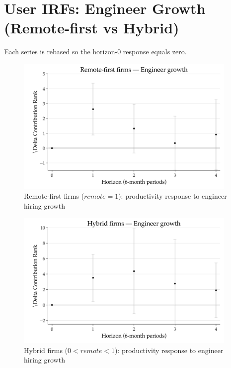 \documentclass[11pt]{article}
\begin{document}
\section*{User IRFs: Engineer Growth (Remote-first vs Hybrid)}

Each series is rebased so the horizon-0 response equals zero.

\begin{figure}[htbp]
    \centering
    \includegraphics[width=0.95\textwidth]{../../results/user_irfs_eng_vs_noneng_remote_hybrid/irf_remote_eng.png}
    \caption{Remote-first firms ($remote = 1$): productivity response to engineer hiring growth}
\end{figure}

\begin{figure}[htbp]
    \centering
    \includegraphics[width=0.95\textwidth]{../../results/user_irfs_eng_vs_noneng_remote_hybrid/irf_hybrid_eng.png}
    \caption{Hybrid firms ($0 < remote < 1$): productivity response to engineer hiring growth}
\end{figure}
\end{document}
